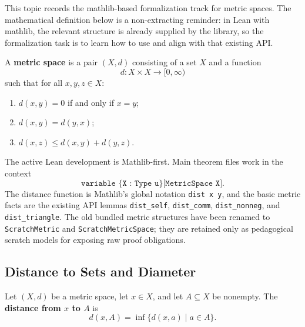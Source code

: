 
\begin{remark*}[Exposition]
This topic records the mathlib-based formalization track for metric spaces.
The mathematical definition below is a non-extracting reminder: in Lean with
mathlib, the relevant structure is already supplied by the library, so the
formalization task is to learn how to use and align with that existing API.
\end{remark*}

\begin{remark*}
\begin{definition*}
A \textbf{metric space} is a pair $(X,d)$ consisting of a set $X$ and a
function
\[
  d\colon X\times X \to [0,\infty)
\]
such that for all $x,y,z\in X$:
\begin{enumerate}
  \item $d(x,y)=0$ if and only if $x=y$;
  \item $d(x,y)=d(y,x)$;
  \item $d(x,z)\leq d(x,y)+d(y,z)$.
\end{enumerate}
\end{definition*}
\end{remark*}

\begin{remark*}
The active Lean development is Mathlib-first. Main theorem files work in the
context
\[
  \texttt{variable \{X : Type u\} [MetricSpace X]}.
\]
The distance function is Mathlib's global notation \texttt{dist x y}, and the
basic metric facts are the existing API lemmas \texttt{dist\_self},
\texttt{dist\_comm}, \texttt{dist\_nonneg}, and \texttt{dist\_triangle}. The
old bundled metric structures have been renamed to \texttt{ScratchMetric} and
\texttt{ScratchMetricSpace}; they are retained only as pedagogical scratch
models for exposing raw proof obligations.
\end{remark*}

\subsection{Distance to Sets and Diameter}

\begin{remark*}
\begin{definition*}
Let $(X,d)$ be a metric space, let $x\in X$, and let $A\subseteq X$ be
nonempty. The \textbf{distance from \(x\) to \(A\)} is
\[
  d(x,A)=\inf\{d(x,a)\mid a\in A\}.
\]
\end{definition*}
\end{remark*}

